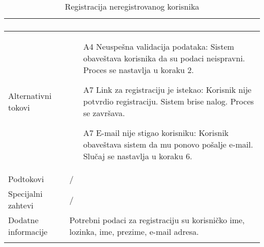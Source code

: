 \documentclass[../main.tex]{subfiles}
\begin{document}
\begin{longtable}{| p{} | p{} |}
\begin{enumerate}
	\end{enumerate}\\
\hline
    Alternativni tokovi & \begin{itemize}
        \item [A4] Neuspešna validacija podataka: Sistem obaveštava korisnika da su podaci neispravni. Proces se nastavlja u koraku 2.
        \item [A7] Link za registraciju je istekao: Korisnik nije potvrdio registraciju. Sistem brise nalog. Proces se završava.
        \item [A7] E-mail nije stigao korisniku: Korisnik obaveštava sistem da mu ponovo pošalje e-mail. Slučaj se nastavlja u koraku 6.
    \end{itemize} \\
\hline
    Podtokovi & / \\
\hline
    Specijalni zahtevi & / \\
\hline
    Dodatne informacije & Potrebni podaci za registraciju su korisničko ime, lozinka, ime, prezime, e-mail adresa. \\
\hline

\caption{Registracija neregistrovanog korisnika}
\end{longtable}
\end{document}
